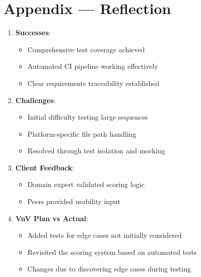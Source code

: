 \documentclass[12pt, titlepage]{article}
\begin{document}
% 
% 

\newpage
\section*{Appendix --- Reflection}

\begin{enumerate}
\item \textbf{Successes}:
\begin{itemize}
\item Comprehensive test coverage achieved
\item Automated CI pipeline working effectively
\item Clear requirements traceability established
\end{itemize}

\item \textbf{Challenges}:
\begin{itemize}
\item Initial difficulty testing large sequences
\item Platform-specific file path handling
\item Resolved through test isolation and mocking
\end{itemize}

\item \textbf{Client Feedback}:
\begin{itemize}
\item Domain expert validated scoring logic
\item Peers provided usability input
\end{itemize}

\item \textbf{VnV Plan vs Actual}:
\begin{itemize}
\item Added tests for edge cases not initially considered
\item Revisited the scoring system based on automated tests
\item Changes due to discovering edge cases during testing
\end{itemize}
\end{enumerate}
\end{document}
